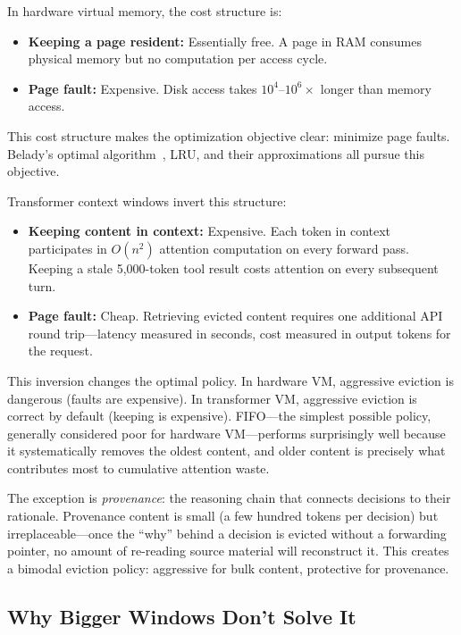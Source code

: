 \documentclass[sigplan,screen,anonymous]{acmart}
\begin{document}
In hardware virtual memory, the cost structure is:
\begin{itemize}
\item \textbf{Keeping a page resident:} Essentially free. A page in
  RAM consumes physical memory but no computation per access cycle.
\item \textbf{Page fault:} Expensive. Disk access takes
  $10^4$--$10^6\times$ longer than memory access.
\end{itemize}

This cost structure makes the optimization objective clear: minimize
page faults. Belady's optimal algorithm~\cite{belady1966anomaly}, LRU,
and their approximations all pursue this objective.

Transformer context windows invert this structure:
\begin{itemize}
\item \textbf{Keeping content in context:} Expensive. Each token in
  context participates in $O(n^2)$ attention computation on every
  forward pass. Keeping a stale 5,000-token tool result costs
  attention on every subsequent turn.
\item \textbf{Page fault:} Cheap. Retrieving evicted content requires
  one additional API round trip---latency measured in seconds, cost
  measured in output tokens for the request.
\end{itemize}

This inversion changes the optimal policy. In hardware VM, aggressive
eviction is dangerous (faults are expensive). In transformer VM,
aggressive eviction is correct by default (keeping is expensive).
FIFO---the simplest possible policy, generally considered poor for
hardware VM---performs surprisingly well because it systematically
removes the oldest content, and older content is precisely what
contributes most to cumulative attention waste.

The exception is \emph{provenance}: the reasoning chain that connects
decisions to their rationale. Provenance content is small (a few
hundred tokens per decision) but irreplaceable---once the ``why''
behind a decision is evicted without a forwarding pointer, no amount
of re-reading source material will reconstruct it. This creates a
bimodal eviction policy: aggressive for bulk content, protective for
provenance.

\subsection{Why Bigger Windows Don't Solve It}
\end{document}
